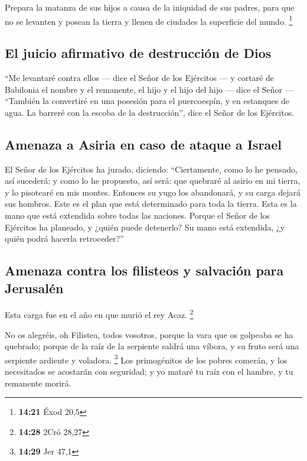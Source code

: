  Prepara la matanza de sus hijos a causa de la iniquidad
de sus padres, para que no se levanten y posean la tierra y llenen de
ciudades la superficie del mundo. \footnote{\textbf{14:21} Éxod 20,5}

\hypertarget{el-juicio-afirmativo-de-destrucciuxf3n-de-dios}{%
\subsection{El juicio afirmativo de destrucción de
Dios}\label{el-juicio-afirmativo-de-destrucciuxf3n-de-dios}}

 ``Me levantaré contra ellos --- dice el Señor de los
Ejércitos --- y cortaré de Babilonia el nombre y el remanente, el hijo y
el hijo del hijo --- dice el Señor ---  ``También la
convertiré en una posesión para el puercoespín, y en estanques de agua.
La barreré con la escoba de la destrucción'', dice el Señor de los
Ejércitos.

\hypertarget{amenaza-a-asiria-en-caso-de-ataque-a-israel}{%
\subsection{Amenaza a Asiria en caso de ataque a
Israel}\label{amenaza-a-asiria-en-caso-de-ataque-a-israel}}

 El Señor de los Ejércitos ha jurado, diciendo:
``Ciertamente, como lo he pensado, así sucederá; y como lo he propuesto,
así será:  que quebraré al asirio en mi tierra, y lo
pisotearé en mis montes. Entonces su yugo los abandonará, y su carga
dejará sus hombros.  Este es el plan que está determinado
para toda la tierra. Esta es la mano que está extendida sobre todas las
naciones.  Porque el Señor de los Ejércitos ha planeado,
y ¿quién puede detenerlo? Su mano está extendida, ¿y quién podrá hacerla
retroceder?''

\hypertarget{amenaza-contra-los-filisteos-y-salvaciuxf3n-para-jerusaluxe9n}{%
\subsection{Amenaza contra los filisteos y salvación para
Jerusalén}\label{amenaza-contra-los-filisteos-y-salvaciuxf3n-para-jerusaluxe9n}}

 Esta carga fue en el año en que murió el rey Acaz.
\footnote{\textbf{14:28} 2Cró 28,27}

 No os alegréis, oh Filistea, todos vosotros, porque la
vara que os golpeaba se ha quebrado; porque de la raíz de la serpiente
saldrá una víbora, y su fruto será una serpiente ardiente y voladora.
\footnote{\textbf{14:29} Jer 47,1}  Los primogénitos de
los pobres comerán, y los necesitados se acostarán con seguridad; y yo
mataré tu raíz con el hambre, y tu remanente morirá.

